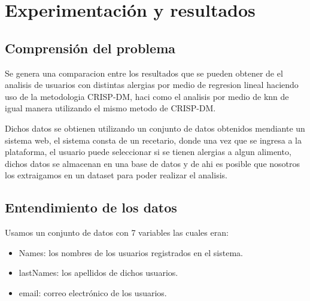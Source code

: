 \documentclass[
]{article}
\providecommand{\tightlist}{%
  \setlength{\itemsep}{0pt}\setlength{\parskip}{0pt}}
\begin{document}
\hypertarget{experimentaciuxf3n-y-resultados}{%
\section{Experimentación y
resultados}\label{experimentaciuxf3n-y-resultados}}

\hypertarget{comprensiuxf3n-del-problema}{%
\subsection{Comprensión del
problema}\label{comprensiuxf3n-del-problema}}

Se genera una comparacion entre los resultados que se pueden obtener de
el analisis de usuarios con distintas alergias por medio de regresion
lineal haciendo uso de la metodologia CRISP-DM, haci como el analisis
por medio de knn de igual manera utilizando el mismo metodo de CRISP-DM.

Dichos datos se obtienen utilizando un conjunto de datos obtenidos
mendiante un sistema web, el sistema consta de un recetario, donde una
vez que se ingresa a la plataforma, el usuario puede seleccionar si se
tienen alergias a algun alimento, dichos datos se almacenan en una base
de datos y de ahi es posible que nosotros los extraigamos en un dataset
para poder realizar el analisis.

\hypertarget{entendimiento-de-los-datos}{%
\subsection{Entendimiento de los
datos}\label{entendimiento-de-los-datos}}

Usamos un conjunto de datos con 7 variables las cuales eran:

\begin{itemize}
\tightlist
\item
  Names: los nombres de los usuarios registrados en el sistema.
\end{itemize}

\begin{itemize}
\tightlist
\item
  lastNames: los apellidos de dichos usuarios.
\end{itemize}

\begin{itemize}
\tightlist
\item
  email: correo electrónico de los usuarios.
\end{itemize}
\end{document}
